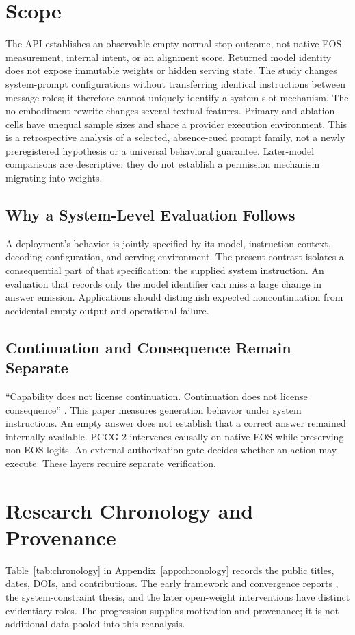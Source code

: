 \documentclass[11pt]{article}
\begin{document}
\section{Scope}
The API establishes an observable empty normal-stop outcome, not native EOS measurement, internal intent, or an alignment score. Returned model identity does not expose immutable weights or hidden serving state. The study changes system-prompt configurations without transferring identical instructions between message roles; it therefore cannot uniquely identify a system-slot mechanism. The no-embodiment rewrite changes several textual features. Primary and ablation cells have unequal sample sizes and share a provider execution environment. This is a retrospective analysis of a selected, absence-cued prompt family, not a newly preregistered hypothesis or a universal behavioral guarantee. Later-model comparisons are descriptive: they do not establish a permission mechanism migrating into weights.

\subsection{Why a System-Level Evaluation Follows}
A deployment's behavior is jointly specified by its model, instruction context, decoding configuration, and serving environment. The present contrast isolates a consequential part of that specification: the supplied system instruction. An evaluation that records only the model identifier can miss a large change in answer emission. Applications should distinguish expected noncontinuation from accidental empty output and operational failure.

\subsection{Continuation and Consequence Remain Separate}
``Capability does not license continuation. Continuation does not license consequence'' \citep{pal_synthesis}. This paper measures generation behavior under system instructions. An empty answer does not establish that a correct answer remained internally available. PCCG-2 intervenes causally on native EOS while preserving non-EOS logits. An external authorization gate decides whether an action may execute. These layers require separate verification.

\clearpage
\section{Research Chronology and Provenance}
Table~\ref{tab:chronology} in Appendix~\ref{app:chronology} records the public titles, dates, DOIs, and contributions. The early framework and convergence reports \citep{pal_framework,pal_convergence}, the system-constraint thesis, and the later open-weight interventions \citep{pal_pccg1,pal_pccg2} have distinct evidentiary roles. The progression supplies motivation and provenance; it is not additional data pooled into this reanalysis.
\end{document}

